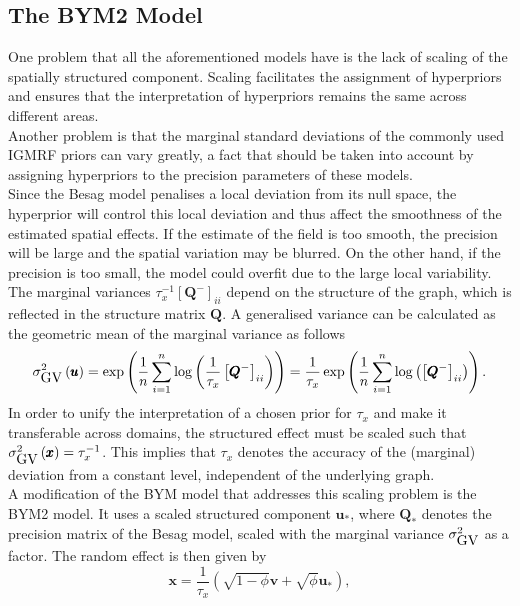 \subsection{The BYM2 Model}
One problem that all the aforementioned models have is the lack of scaling of the spatially structured component. Scaling facilitates the assignment of hyperpriors and ensures that the interpretation of hyperpriors remains the same across different areas. \\
Another problem is that the marginal standard deviations of the commonly used IGMRF priors can vary greatly, a fact that should be taken into account by assigning hyperpriors to the precision parameters of these models. \\
Since the Besag model penalises a local deviation from its null space, the hyperprior will control this local deviation and thus affect the smoothness of the estimated spatial effects. If the estimate of the field is too smooth, the precision will be large and the spatial variation may be blurred. On the other hand, if the precision is too small, the model could overfit due to the large local variability. \\
The marginal variances $\tau_x^{-1}\left[\pmb{Q}^{-}\right]_{ii}$ depend on the structure of the graph, which is reflected in the structure matrix $\pmb{Q}$. A generalised variance can be calculated as the geometric mean of the marginal variance as follows
\begin{equation}\label{eq:bym_scale}
    \sigma_{\hbox{GV}}^2\left(\pmb{u}\right)=\exp\left(\frac{1}{n}\sum_{i=1}^n\log\left(\frac{1}{\tau_x}\left[\pmb{Q}^{-}\right]_{ii}\right)\right)=\frac{1}{\tau_x}\exp\left(\frac{1}{n}\sum_{i=1}^n\log\left(\left[\pmb{Q}^{-}\right]_{ii}\right)\right).
\end{equation}
In order to unify the interpretation of a chosen prior for $\tau_x$ and make it transferable across domains, the structured effect must be scaled such that $\sigma_{\hbox{GV}}^2\left(\pmb{x}\right)=\tau_x^{-1}$. This implies that $\tau_x$ denotes the accuracy of the (marginal) deviation from a constant level, independent of the underlying graph. \\
A modification of the BYM model that addresses this scaling problem is the BYM2 model. It uses a scaled structured component $\pmb{u}_{*}$, where $\pmb{Q}_{*}$ denotes the precision matrix of the Besag model, scaled with the marginal variance $\sigma_{\hbox{GV}}^2$ as a factor. The random effect is then given by
\begin{equation}\label{eq:bym2_1}
    \pmb{x}=\frac{1}{\tau_x}\left(\sqrt{1-\phi}\pmb{v}+\sqrt{\phi}\pmb{u}_{*}\right),
\end{equation}
